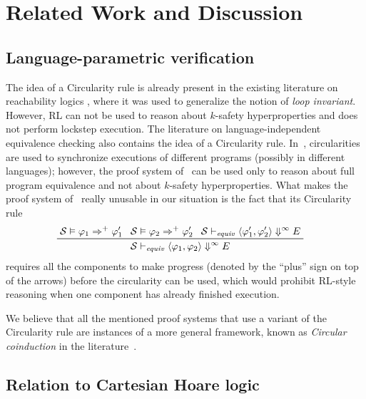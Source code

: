 
\section{Related Work and Discussion}\label{sec:discussion}

\subsection{Language-parametric verification}

The idea of a Circularity rule is already present 
in the existing literature on reachability logics \cite{RosuS12oopsla,RosuSCM13lics,StefanescuCMMSR19},
where it was used to generalize the notion of \emph{loop invariant}.
However, RL can not be used to reason about $k$-safety hyperproperties and does not perform lockstep execution.
The literature on language-independent equivalence checking also contains the idea of a Circularity rule.
In~\cite{CiobacaLRR16}, circularities are used to synchronize executions of different programs (possibly in different languages);
however, the proof system of~\cite{CiobacaLRR16} can be used only to reason about full program equivalence
and not about $k$-safety hyperproperties.
What makes the proof system of~\cite{CiobacaLRR16} really unusable in our situation is the fact that its
Circularity rule
\begin{align*}
  & \prftree[l]{}
    { \mathcal{S} \vDash \varphi_1 \Rightarrow^+ \varphi^\prime_1 }
    { \mathcal{S} \vDash \varphi_2 \Rightarrow^+ \varphi^\prime_2 }
    { \mathcal{S} \vdash_{\mathit{equiv}} \langle \varphi^\prime_1, \varphi^\prime_2 \rangle \Downarrow^{\infty} E}
    { \mathcal{S} \vdash_{\mathit{equiv}} \langle \varphi_1, \varphi_2 \rangle \Downarrow^{\infty} E}
\end{align*}
requires all the components to make progress (denoted by the ``plus'' sign on top of the arrows) before the circularity can be used,
which would prohibit RL-style reasoning when one component has already finished execution.

We believe that all the mentioned proof systems that use a variant of the Circularity rule are instances of a more general
framework, known as \emph{Circular coinduction} in the literature~\cite{RosuL09CircularCoinduction}.



\subsection{Relation to Cartesian Hoare logic}

